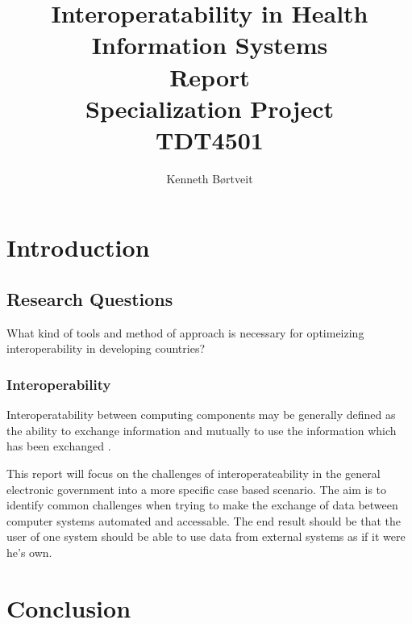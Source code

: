 \documentclass[10pt, a4paper]{report}
\title{{\Huge Interoperatability in Health Information Systems} \\ Report \\ Specialization Project \\ TDT4501}
\author{Kenneth Børtveit}
\begin{document}
\maketitle
\tableofcontents
\listoffigures
\listoftables
\printnomenclature
\begin{abstract}

\end{abstract}
\chapter{Introduction}
\section{Research Questions}
What kind of tools and method of approach is necessary for optimeizing interoperability in developing countries?
\subsection{Interoperability}
Interoperatability between computing components may be generally defined as the ability to exchange information and mutually to use the information which has been exchanged \cite{6}. 

This report will focus on the challenges of interoperateability in the general electronic government  into a more specific case based scenario. The aim is to identify common challenges when trying to make the exchange of data between computer systems automated and accessable. The end result should be that the user of one system should be able to use data from external systems as if it were he's own.

 


\chapter{Conclusion}


\end{document}
